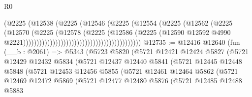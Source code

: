 \begin{lexlean}{R0}
\begin{coremodule}
                                                            (@2225
                                                              (@12538
                                                                (@2225
                                                                  (@12546
                                                                    (@2225
                                                                      (@12554
                                                                        (@2225
                                                                          (@12562
                                                                            (@2225
                                                                              (@12570
                                                                                (@2225
                                                                                  (@12578
                                                                                    (@2225
                                                                                      (@12586
                                                                                        (@2225
                                                                                          (@12590
                                                                                            @12592
                                                                                            @4990
                                                                                            @2221))))))))))))))))))))))))))))))))))))))))))))
@12735 := @12416
    @12640
    (fun (__b : @2061) =>
    @5343
      (@5723
        @5820
        (@5721
          @12421
          @12424
          @5827
          (@5721
            @12429
            @12432
            @5834
            (@5721
              @12437
              @12440
              @5841
              (@5721
                @12445
                @12448
                @5848
                (@5721
                  @12453
                  @12456
                  @5855
                  (@5721
                    @12461
                    @12464
                    @5862
                    (@5721
                      @12469
                      @12472
                      @5869
                      (@5721
                        @12477
                        @12480
                        @5876
                        (@5721
                          @12485
                          @12488
                          @5883

\end{coremodule}
\end{lexlean}
